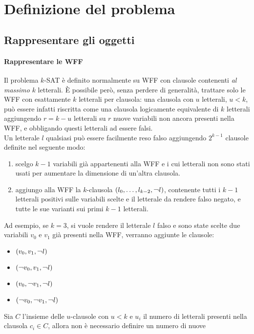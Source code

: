 \chapter{Definizione del problema}

\section{Rappresentare gli oggetti}

\subsubsection{Rappresentare le WFF}
Il problema $k$-SAT è definito normalmente su WFF con clausole contenenti \textit{al massimo} $k$ letterali.
È possibile però, senza perdere di generalità, trattare solo le WFF con esattamente $k$ letterali
per clausola: una clausola con $u$ letterali, $u < k$, può essere infatti riscritta come una clausola logicamente equivalente di $k$ letterali aggiungendo $r = k - u$ letterali su $r$ nuove variabili non ancora presenti nella WFF, e obbligando questi letterali ad essere falsi.\\
Un letterale $l$ qualsiasi può essere facilmente reso falso aggiungendo $2^{k-1}$ clausole definite nel seguente modo:
\begin{enumerate}
    \item scelgo $k-1$ variabili già appartenenti alla WFF e i cui letterali non sono stati usati per aumentare la dimensione di un'altra clausola.
    \item aggiungo alla WFF la $k$-clausola $\bra{l_0, \ldots, l_{k-2}, \lnot l}$, contenente tutti i $k-1$ letterali positivi sulle variabili scelte e il letterale da rendere falso negato, e tutte le sue varianti sui primi $k-1$ letterali.
\end{enumerate}
Ad esempio, se $k=3$, si vuole rendere il letterale $l$ falso e sono state scelte due variabili $v_0$ e $v_1$ già presenti nella WFF, verranno aggiunte le clausole:
\begin{itemize}
    \item $\bra{v_0, v_1, \lnot l}$
    \item $\bra{\lnot v_0, v_1, \lnot l}$
    \item $\bra{v_0, \lnot v_1, \lnot l}$
    \item $\bra{\lnot v_0, \lnot v_1, \lnot l}$
\end{itemize}
Sia $C$ l'insieme delle $u$-clausole con $u < k$ e $u_i$ il numero di letterali presenti nella clausola $c_i \in C$, allora non è necessario definire un numero di nuove
